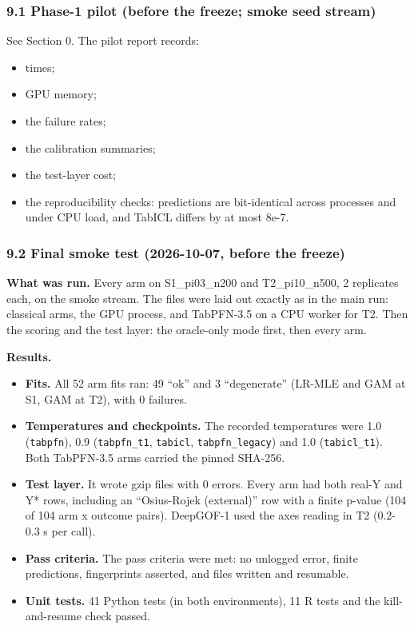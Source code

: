 \documentclass[
  10pt,
]{article}
\providecommand{\tightlist}{%
  \setlength{\itemsep}{0pt}\setlength{\parskip}{0pt}}
\begin{document}
\subsubsection{9.1 Phase-1 pilot (before the freeze; smoke
seed
stream)}\label{phase-1-pilot-before-the-freeze-smoke-seed-stream}

See Section 0. The pilot report records:

\begin{itemize}
\tightlist
\item
  times;
\item
  GPU memory;
\item
  the failure rates;
\item
  the calibration summaries;
\item
  the test-layer cost;
\item
  the reproducibility checks: predictions are bit-identical
  across processes and under CPU load, and TabICL differs by
  at most 8e-7.
\end{itemize}

\subsubsection{9.2 Final smoke test (2026-10-07, before the
freeze)}\label{final-smoke-test-2026-10-07-before-the-freeze}

\textbf{What was run.} Every arm on S1\_pi03\_n200 and
T2\_pi10\_n500, 2 replicates each, on the smoke stream. The
files were laid out exactly as in the main run: classical
arms, the GPU process, and TabPFN-3.5 on a CPU worker for
T2. Then the scoring and the test layer: the oracle-only
mode first, then every arm.

\textbf{Results.}

\begin{itemize}
\tightlist
\item
  \textbf{Fits.} All 52 arm fits ran: 49 ``ok'' and 3
  ``degenerate'' (LR-MLE and GAM at S1, GAM at T2), with 0
  failures.
\item
  \textbf{Temperatures and checkpoints.} The recorded
  temperatures were 1.0 (\texttt{tabpfn}), 0.9
  (\texttt{tabpfn\_t1}, \texttt{tabicl},
  \texttt{tabpfn\_legacy}) and 1.0 (\texttt{tabicl\_t1}).
  Both TabPFN-3.5 arms carried the pinned SHA-256.
\item
  \textbf{Test layer.} It wrote gzip files with 0 errors.
  Every arm had both real-Y and Y* rows, including an
  ``Osius-Rojek (external)'' row with a finite p-value (104
  of 104 arm x outcome pairs). DeepGOF-1 used the axes
  reading in T2 (0.2-0.3 s per call).
\item
  \textbf{Pass criteria.} The pass criteria were met: no
  unlogged error, finite predictions, fingerprints asserted,
  and files written and resumable.
\item
  \textbf{Unit tests.} 41 Python tests (in both
  environments), 11 R tests and the kill-and-resume check
  passed.
\end{itemize}
\end{document}
